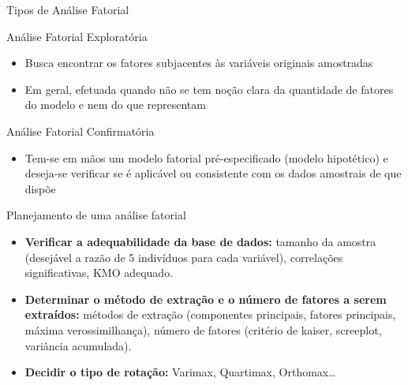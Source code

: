 \documentclass[
  ignorenonframetext,
  aspectratio=169,
]{beamer}
\providecommand{\tightlist}{%
  \setlength{\itemsep}{0pt}\setlength{\parskip}{0pt}}
\begin{document}
\begin{frame}{Tipos de Análise Fatorial}
\label{tipos-de-anuxe1lise-fatorial}
\begin{block}{Análise Fatorial Exploratória}
\label{anuxe1lise-fatorial-exploratuxf3ria}
\medskip

\begin{itemize}
\item
  Busca encontrar os fatores subjacentes às variáveis originais
  amostradas
\item
  Em geral, efetuada quando não se tem noção clara da quantidade de
  fatores do modelo e nem do que representam
\end{itemize}
\end{block}

\begin{block}{Análise Fatorial Confirmatória}
\label{anuxe1lise-fatorial-confirmatuxf3ria}
\begin{itemize}
\tightlist
\item
  Tem-se em mãos um modelo fatorial pré-especificado (modelo hipotético)
  e deseja-se verificar se é aplicável ou consistente com os dados
  amostrais de que dispõe
\end{itemize}
\end{block}
\end{frame}

\begin{frame}{Planejamento de uma análise fatorial}
\label{planejamento-de-uma-anuxe1lise-fatorial}
\begin{itemize}
\tightlist
\item
  \textbf{Verificar a adequabilidade da base de dados:} tamanho da
  amostra (desejável a razão de 5 indivíduos para cada variável),
  correlações significativas, KMO adequado.
\end{itemize}

\pause

\begin{itemize}
\tightlist
\item
  \textbf{Determinar o método de extração e o número de fatores a serem
  extraídos:} métodos de extração (componentes principais, fatores
  principais, máxima verossimilhança), número de fatores (critério de
  kaiser, screeplot, variância acumulada).
\end{itemize}

\pause

\begin{itemize}
\tightlist
\item
  \textbf{Decidir o tipo de rotação:} Varimax, Quartimax,
  Orthomax\ldots{}
\end{itemize}
\end{frame}
\end{document}
